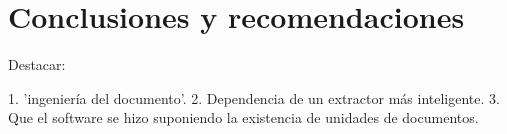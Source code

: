 \chapter*{Conclusiones y recomendaciones} \label{chap:conclusiones}

Destacar:

1.  'ingeniería del documento'. 
2. Dependencia de un extractor más inteligente.
3. Que el software se hizo suponiendo la existencia de unidades de documentos. 